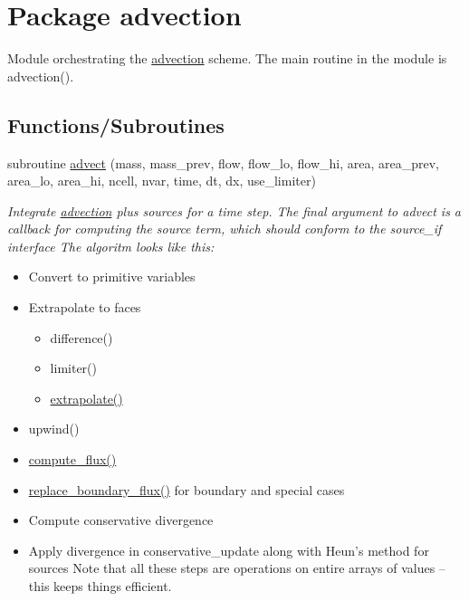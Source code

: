 \hypertarget{a00049}{
\section{Package advection}
\label{a00049}
}
Module orchestrating the \hyperlink{a00049}{advection} scheme. The main routine in the module is advection().  


\subsection*{Functions/Subroutines}
\begin{CompactItemize}
\item 
subroutine \hyperlink{a00049_9ec45d9c2fabe0abb0a60795bc228f59}{advect} (mass, mass\_\-prev, flow, flow\_\-lo, flow\_\-hi, area, area\_\-prev, area\_\-lo, area\_\-hi, ncell, nvar, time, dt, dx, use\_\-limiter)
\begin{CompactList}\small\item\em Integrate \hyperlink{a00049}{advection} plus sources for a time step. The final argument to advect is a callback for computing the source term, which should conform to the source\_\-if interface The algoritm looks like this:\begin{itemize}
\item Convert to primitive variables\item Extrapolate to faces\begin{itemize}
\item difference()\item limiter()\item \hyperlink{a00049_36ba824cb5dc6ca6127866376d2e79ec}{extrapolate()}\end{itemize}
\item upwind()\item \hyperlink{a00049_3947a8a29b1c666b2d1b7223215e9873}{compute\_\-flux()}\item \hyperlink{a00049_ce0b27ec0ac171c15a919d07fb3b32c3}{replace\_\-boundary\_\-flux()} for boundary and special cases\item Compute conservative divergence\item Apply divergence in conservative\_\-update along with Heun's method for sources Note that all these steps are operations on entire arrays of values -- this keeps things efficient. \end{itemize}
\item\end{CompactList}\item 

\end{CompactItemize}
